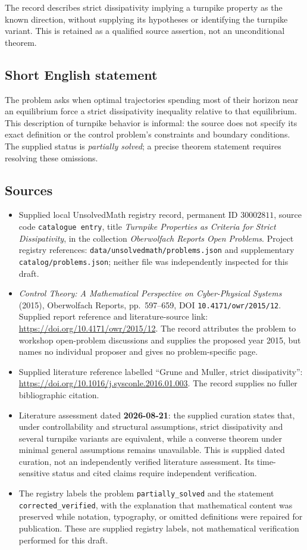 \documentclass[11pt]{article}
\begin{document}
The record describes strict dissipativity implying a turnpike property as the known direction, without supplying its hypotheses or identifying the turnpike variant. This is retained as a qualified source assertion, not an unconditional theorem.
\subsection{Short English statement}
The problem asks when optimal trajectories spending most of their horizon near an equilibrium force a strict dissipativity inequality relative to that equilibrium. This description of turnpike behavior is informal: the source does not specify its exact definition or the control problem's constraints and boundary conditions. The supplied status is \emph{partially solved}; a precise theorem statement requires resolving these omissions.
\subsection{Sources}
\begin{itemize}
\item Supplied local UnsolvedMath registry record, permanent ID \(30002811\), source code \texttt{catalogue entry}, title \emph{Turnpike Properties as Criteria for Strict Dissipativity}, in the collection \emph{Oberwolfach Reports Open Problems}. Project registry references: \texttt{data/unsolvedmath/problems.json} and supplementary \texttt{catalog/problems.json}; neither file was independently inspected for this draft.
\item \emph{Control Theory: A Mathematical Perspective on Cyber-Physical Systems} (2015), Oberwolfach Reports, pp.~597--659, DOI \texttt{10.4171/owr/2015/12}. Supplied report reference and literature-source link: \url{https://doi.org/10.4171/owr/2015/12}. The record attributes the problem to workshop open-problem discussions and supplies the proposed year 2015, but names no individual proposer and gives no problem-specific page.
\item Supplied literature reference labelled ``Grune and Muller, strict dissipativity'': \url{https://doi.org/10.1016/j.sysconle.2016.01.003}. The record supplies no fuller bibliographic citation.
\item Literature assessment dated \textbf{2026-08-21}: the supplied curation states that, under controllability and structural assumptions, strict dissipativity and several turnpike variants are equivalent, while a converse theorem under minimal general assumptions remains unavailable. This is supplied dated curation, not an independently verified literature assessment. Its time-sensitive status and cited claims require independent verification.
\item The registry labels the problem \texttt{partially\_solved} and the statement \texttt{corrected\_verified}, with the explanation that mathematical content was preserved while notation, typography, or omitted definitions were repaired for publication. These are supplied registry labels, not mathematical verification performed for this draft.
\end{itemize}
\end{document}
